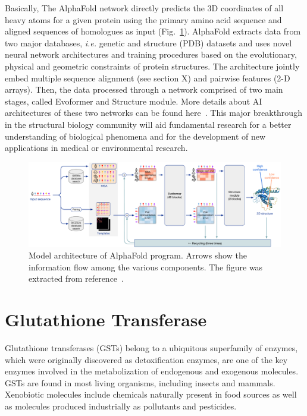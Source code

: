 Basically, The AlphaFold network directly predicts the 3D coordinates of all heavy atoms for a given protein using the primary amino acid sequence and aligned sequences of homologues as input (Fig.~\ref{FIG1}). AlphaFold extracts data from two major databases, \textit{i.e.} genetic and structure (PDB) datasets and uses novel neural network architectures and training procedures based on the evolutionary, physical and geometric constraints of protein structures. The architecture jointly embed multiple sequence alignment (see section X) and pairwise features (2-D arrays). Then, the data processed through a network comprised of two main stages, called Evoformer and Structure module. More details about AI architectures of these two networks can be found here~\cite{AlphaFold}.
This major breakthrough in the structural biology community will aid fundamental research for a better understanding of biological phenomena and for the development of new applications in medical or environmental research.

\begin{figure}[h!]
	\includegraphics[width=16cm]{../figures/figure_AF_scheme.pdf}
	\caption{Model architecture of AlphaFold program. Arrows show the information flow among the various components. The figure was extracted from reference~\cite{AlphaFold}.}
	\label{FIG1}
\end{figure}

\section{Glutathione Transferase}
Glutathione transferases (GSTs) belong to a ubiquitous superfamily of enzymes, which were originally discovered as detoxification enzymes, are one of the key enzymes involved in the metabolization of endogenous and exogenous molecules\cite{F-Neiers-GSTs}. GSTs are found in most living organisms, including insects and mammals. Xenobiotic molecules include chemicals naturally present in food sources as well as molecules produced industrially as pollutants and pesticides.

